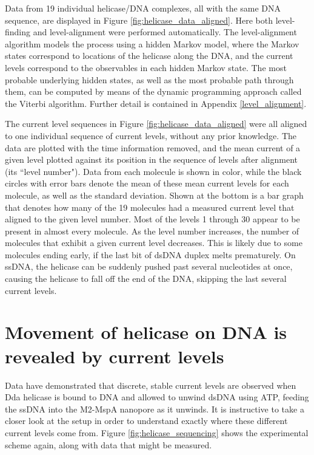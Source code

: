 Data from \num{19} individual helicase/DNA complexes, all with the same DNA sequence, are displayed in Figure \ref{fig:helicase_data_aligned}.  Here both level-finding and level-alignment were performed automatically.  The level-alignment algorithm models the process using a hidden Markov model, where the Markov states correspond to locations of the helicase along the DNA, and the current levels correspond to the observables in each hidden Markov state.  The most probable underlying hidden states, as well as the most probable path through them, can be computed by means of the dynamic programming approach called the Viterbi algorithm.  Further detail is contained in Appendix \ref{level_alignment}.

The current level sequences in Figure \ref{fig:helicase_data_aligned} were all aligned to one individual sequence of current levels, without any prior knowledge.  The data are plotted with the time information removed, and the mean current of a given level plotted against its position in the sequence of levels after alignment (its ``level number").  Data from each molecule is shown in color, while the black circles with error bars denote the mean of these mean current levels for each molecule, as well as the standard deviation.  Shown at the bottom is a bar graph that denotes how many of the \num{19} molecules had a measured current level that aligned to the given level number.  Most of the levels \num{1} through \num{30} appear to be present in almost every molecule.  As the level number increases, the number of molecules that exhibit a given current level decreases.  This is likely due to some molecules ending early, if the last bit of dsDNA duplex melts prematurely.  On ssDNA, the helicase can be suddenly pushed past several nucleotides at once, causing the helicase to fall off the end of the DNA, skipping the last several current levels.

\section{Movement of helicase on DNA is revealed by current levels}

Data have demonstrated that discrete, stable current levels are observed when Dda helicase is bound to DNA and allowed to unwind dsDNA using ATP, feeding the ssDNA into the M2-MspA nanopore as it unwinds.  It is instructive to take a closer look at the setup in order to understand exactly where these different current levels come from.  Figure \ref{fig:helicase_sequencing} shows the experimental scheme again, along with data that might be measured.

